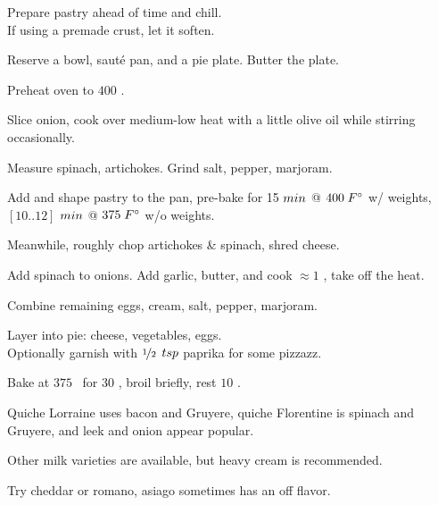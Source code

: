 \begin{preparation}
\item Prepare pastry ahead of time and chill.\\
	If using a premade crust, let it soften.

\item Reserve a bowl, saut\'{e} pan, and a pie plate. Butter the plate.

\item Preheat oven to $400$ \Fahrenheit.

\item Slice onion, cook over medium-low heat with a little olive oil while stirring occasionally.

\item Measure spinach, artichokes. Grind salt, pepper, marjoram.

\item Add and shape pastry to the pan, pre-bake for 15 $\minute$ @ $400\;\Fahrenheit$ w/ weights, $[10..12]$  $\minute$ @ $375\;\Fahrenheit$ w/o weights.

\item Meanwhile, roughly chop artichokes \& spinach, shred cheese.

\item Add spinach to onions.
	Add garlic, butter, and cook $\approx 1$ \minute, take off the heat.

\item Combine remaining eggs, cream, salt, pepper, marjoram.

\item Layer into pie: cheese, vegetables, eggs.\\
	Optionally garnish with $\onehalf$ $\teaspoon$ paprika for some pizzazz.

\item Bake at $375$ \Fahrenheit~for $30$ \minute, broil briefly, rest $10$ \minute.
\end{preparation}


\begin{variation}
\item Quiche Lorraine uses bacon and Gruyere, quiche Florentine is spinach and Gruyere, and leek and onion appear popular.

\item Other milk varieties are available, but heavy cream is recommended.
\end{variation}

\begin{experiments}
\item Try cheddar or romano, asiago sometimes has an off flavor.
\end{experiments}


\recipeend%
